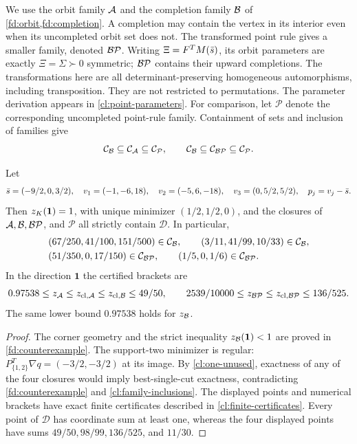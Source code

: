 We use the orbit family $\mathcal A$ and the completion family $\mathcal B$ of
\cref{fd:orbit,fd:completion}. A completion may contain the vertex in its
interior even when its uncompleted orbit set does not.
The transformed point rule gives a smaller family, denoted $\mathcal {BP}$.
Writing $\Xi=F^TM(\bar s)$, its orbit parameters are exactly
$\Xi=\Sigma\succ0$ symmetric; $\mathcal {BP}$ contains their upward completions.
The transformations here are all determinant-preserving homogeneous
automorphisms, including transposition. They are not restricted to
permutations. The parameter derivation appears in
\cref{cl:point-parameters}.
For comparison, let $\mathcal P$ denote the corresponding uncompleted
point-rule family. Containment of sets and inclusion of families give
\begin{equation}\label{cl:family-inclusions}
 \mathcal C_{\mathcal B}\subseteq\mathcal C_{\mathcal A}
 \subseteq\mathcal C_{\mathcal P},\qquad
 \mathcal C_{\mathcal B}\subseteq\mathcal C_{\mathcal {BP}}
 \subseteq\mathcal C_{\mathcal P}.
\end{equation}

\begin{theorem}\label{cl:counterexample}
Let
\[
 \bar s=(-9/2,0,3/2),\quad
 v_1=(-1,-6,18),\quad v_2=(-5,6,-18),\quad
 v_3=(0,5/2,5/2),\quad p_j=v_j-\bar s.
\]
Then $z_K(\mathbf1)=1$, with unique minimizer $(1/2,1/2,0)$,
and the closures of $\mathcal A,\mathcal B,\mathcal {BP}$, and $\mathcal P$ all strictly
contain $\mathcal D$. In particular,
\begin{align*}
 &(67/250,41/100,151/500)\in\mathcal C_{\mathcal B},\qquad
 (3/11,41/99,10/33)\in\mathcal C_{\mathcal B},\\
 &(51/350,0,17/150)\in\mathcal C_{\mathcal {BP}},\qquad
 (1/5,0,1/6)\in\mathcal C_{\mathcal {BP}}.
\end{align*}
In the direction $\mathbf1$ the certified brackets are
\[
 0.97538\le z_{\mathcal A}\le z_{\mathrm{cl},\mathcal A}
 \le z_{\mathrm{cl},\mathcal B}\le49/50,
 \qquad
 2539/10000\le z_{\mathcal {BP}}\le z_{\mathrm{cl},\mathcal {BP}}\le136/525.
\]
The same lower bound $0.97538$ holds for $z_{\mathcal B}$.
\end{theorem}

\begin{proof}
The corner geometry and the strict inequality $z_{\mathcal B}(\mathbf1)<1$ are
proved in \cref{fd:counterexample}. The support-two minimizer is regular:
$P_{\{1,2\}}^T\nabla q=(-3/2,-3/2)$ at its image.
By \cref{cl:one-unused}, exactness of any of the four closures would imply
best-single-cut exactness, contradicting \cref{fd:counterexample} and
\cref{cl:family-inclusions}.
The displayed points and numerical brackets have exact finite
certificates described in \cref{cl:finite-certificates}.
Every point of $\mathcal D$ has coordinate sum at least one, whereas the
four displayed points have sums $49/50,98/99,136/525$, and $11/30$.
\end{proof}

